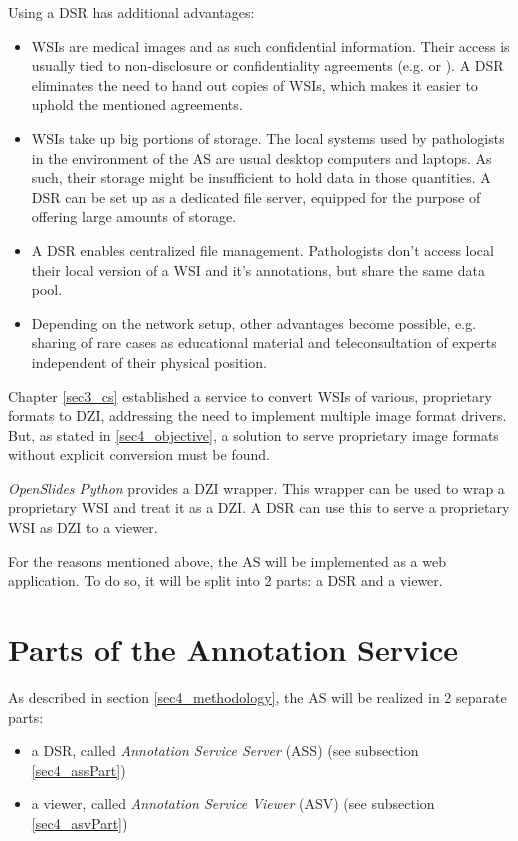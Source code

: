 Using a DSR has additional advantages: 
\begin{itemize}
	\item WSIs are medical images and as such confidential information. Their access is usually tied to non-disclosure or confidentiality agreements (e.g. \cite{COA} or \cite{USSanDiego}). A DSR eliminates the need to hand out copies of WSIs, which makes it easier to uphold the mentioned agreements.
	\item WSIs take up big portions of storage\cite{Singh11}. The local systems used by pathologists in the environment of the AS are usual desktop computers and laptops. As such, their storage might be insufficient to hold data in those quantities. A DSR can be set up as a dedicated file server, equipped for the purpose of offering large amounts of storage.
	\item A DSR enables centralized file management. Pathologists don't access local their local version of a WSI and it's annotations, but share the same data pool.
	\item Depending on the network setup, other advantages become possible, e.g. sharing of rare cases as educational material and teleconsultation of experts independent of their physical position\cite{Wilbur09}.
\end{itemize}

Chapter \ref{sec3_cs} established a service to convert WSIs of various, proprietary formats to DZI, addressing the need to implement multiple image format drivers. But, as stated in \ref{sec4_objective}, a solution to serve proprietary image formats without explicit conversion must be found.

\emph{OpenSlides Python} provides a DZI wrapper. This wrapper can be used to wrap a proprietary WSI and treat it as a DZI\cite{web:openslide}. A DSR can use this to serve a proprietary WSI as DZI to a viewer.

For the reasons mentioned above, the AS will be implemented as a web application. To do so, it will be split into 2 parts: a DSR and a viewer.


\section{Parts of the Annotation Service}
\label{sec4_parts}
As described in section \ref{sec4_methodology}, the AS will be realized in 2 separate parts:
\begin{itemize}
	\item a DSR, called \emph{Annotation Service Server} (ASS) (see subsection \ref{sec4_assPart})
	\item a viewer, called \emph{Annotation Service Viewer} (ASV) (see subsection \ref{sec4_asvPart})
\end{itemize}

